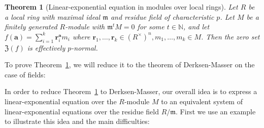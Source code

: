 \documentclass[letterpaper, 11pt, thm-restate]{article}
\numberwithin{equation}{section}
\newcommand{\N}{\mathbb{N}}
\newcommand{\mZ}{\mathfrak{Z}}
\newcommand{\ba}{\boldsymbol{a}}
\newcommand{\br}{\boldsymbol{r}}
\newcommand{\frm}{\mathfrak{m}}
\newtheorem{theorem}{Theorem}[section]
\theoremstyle{definition}
\theoremstyle{definition}
\theoremstyle{definition}
\begin{document}
\begin{theorem}[Linear-exponential equation in modules over local rings]\label{thm:local}
    Let $R$ be a local ring with maximal ideal $\frm$ and residue field of characteristic $p$.
    Let $M$ be a finitely generated $R$-module with $\frm^tM=0$ for some $t \in \N$, and let $f(\ba)=\sum_{i = 1}^k\br_i^{\ba} m_i$ where $\br_1,\ldots,\br_k\in (R^{\times})^n, m_1,\ldots,m_k\in M$.
    Then the zero set $\mZ(f)$ is effectively $p$-normal.
\end{theorem}

To prove Theorem~\ref{thm:local}, we will reduce it to the theorem of Derksen-Masser on the case of fields:

{\renewcommand\footnote[1]{}\thmfield*}

In order to reduce Theorem~\ref{thm:local} to Derksen-Masser, our overall idea is to express a linear-exponential equation over the $R$-module $M$ to an equivalent system of linear-exponential equations over the residue field $R/\frm$.
First we use an example to illustrate this idea and the main difficulties:
\end{document}
